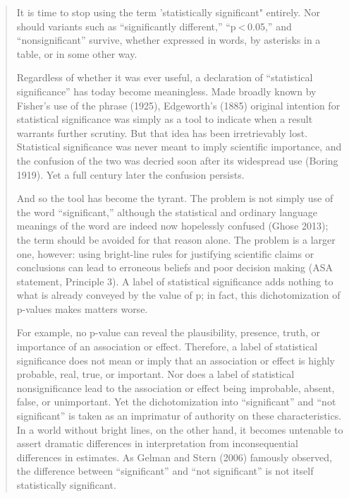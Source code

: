 \documentclass[]{book}
\begin{document}
\begin{quote}
It is time to stop using the term 'statistically significant" entirely. Nor should variants such as ``significantly different,'' ``p \textless{} 0.05,'' and ``nonsignificant'' survive, whether expressed in words, by asterisks in a table, or in some other way.

Regardless of whether it was ever useful, a declaration of ``statistical significance'' has today become meaningless. Made broadly known by Fisher's use of the phrase (1925), Edgeworth's (1885) original intention for statistical significance was simply as a tool to indicate when a result warrants further scrutiny. But that idea has been irretrievably lost. Statistical significance was never meant to imply scientific importance, and the confusion of the two was decried soon after its widespread use (Boring 1919). Yet a full century later the confusion persists.

And so the tool has become the tyrant. The problem is not simply use of the word ``significant,'' although the statistical and ordinary language meanings of the word are indeed now hopelessly confused (Ghose 2013); the term should be avoided for that reason alone. The problem is a larger one, however: using bright-line rules for justifying scientific claims or conclusions can lead to erroneous beliefs and poor decision making (ASA statement, Principle 3). A label of statistical significance adds nothing to what is already conveyed by the value of p; in fact, this dichotomization of p-values makes matters worse.

For example, no p-value can reveal the plausibility, presence, truth, or importance of an association or effect. Therefore, a label of statistical significance does not mean or imply that an association or effect is highly probable, real, true, or important. Nor does a label of statistical nonsignificance lead to the association or effect being improbable, absent, false, or unimportant. Yet the dichotomization into ``significant'' and ``not significant'' is taken as an imprimatur of authority on these characteristics. In a world without bright lines, on the other hand, it becomes untenable to assert dramatic differences in interpretation from inconsequential differences in estimates. As Gelman and Stern (2006) famously observed, the difference between ``significant'' and ``not significant'' is not itself statistically significant.


\end{quote}
\end{document}
